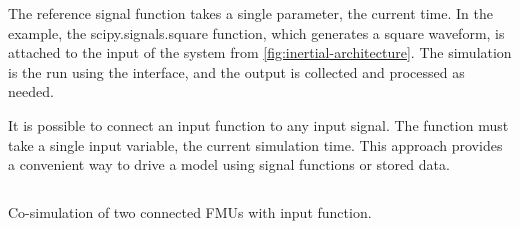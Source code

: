 \documentclass[\rootfolder/main.tex]{subfiles}
\begin{document}
The reference signal function takes a single parameter, the current time.
In the example, the scipy.signals.square function, which generates a square waveform, is attached to the input of the system from \cref{fig:inertial-architecture}.
The simulation is the run using the interface, and the output is collected and processed as needed.

It is possible to connect an input function to any input signal.
The function must take a single input variable, the current simulation time.
This approach provides a convenient way to drive a model using signal functions or stored data.

\begin{listing}[ht]
    \inputminted[fontsize=\footnotesize, firstline=3, lastline=28]{Python}{\rootfolder/Chapters/Chapter2/Listings/simulate.py}
    \caption{Co-simulation of two connected FMUs with input function.\label{lst:connected_fmus}}
\end{listing}
\end{document}
